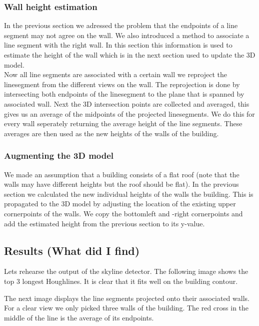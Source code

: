\documentclass[10pt]{article}
\begin{document}
\subsubsection{Wall height estimation}
	In the previous section we adressed the problem that the endpoints of a line segment may not agree on the wall.  We also introduced a method to associate a line segment with the right wall. In this section this information is used to estimate the height of the wall which is in the next section used to update the 3D model.\\
	Now all line segments are associated with a certain wall we reproject the linesegment from the different views on the wall. The reprojection is done by intersecting both endpoints of the linesegment to the plane that is spanned by associated wall.
	Next the 3D intersection points are collected and averaged, this gives us an average of the midpoints of the projected linesegments. We do this for every wall seperately returning the average height of the line segments.
	These averages are then used as the new heights of the walls of the building.

\subsubsection{Augmenting the 3D model} %
	We made an assumption that a building consists of a flat roof (note that the walls may have different heights but the roof should be flat).
	In the previous section we calculated the new individual heights of the walls the building. 
	This is propagated to the 3D model by adjusting the location of the existing upper cornerpoints of the walls. We copy the bottomleft and -right cornerpoints and add the estimated height from the previous section to its y-value.

	

\subsection{Results (What did I find)}
Lets rehearse the output of the skyline detector.
The following image shows the top 3 longest Houghlines. It is clear that it fits
well on the building contour.

The next image displays the line segments projected onto their associated walls.
For a clear view we only picked three walls of the building.
The red cross in the middle of the line is the average of its endpoints.
\end{document}
